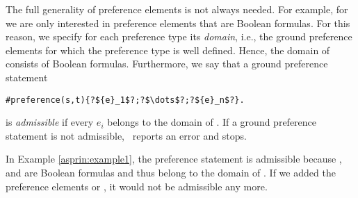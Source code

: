 The full generality of preference elements is not always needed.
For example, for  we are only interested in preference elements that are Boolean formulas.
For this reason, we specify for each preference type its \emph{domain}, 
i.e., the ground preference elements for which the preference type is well defined.
Hence, the domain of  consists of Boolean formulas.
Furthermore, we say that a ground preference statement
\begin{lstlisting}[numbers=none,escapechar=?]
#preference(s,t){?${e}_1$?;?$\dots$?;?${e}_n$?}.
\end{lstlisting}
is \emph{admissible} if every ${e}_i$ belongs to the domain of .
If a ground preference statement is not admissible, \asprin\ reports an error and stops. 
\begin{example}
In Example \ref{asprin:example1}, the preference statement   
is admissible because ,  and  are Boolean formulas
and thus belong to the domain of . 
If we added the preference elements  or , 
it would not be admissible any more.
\end{example}

